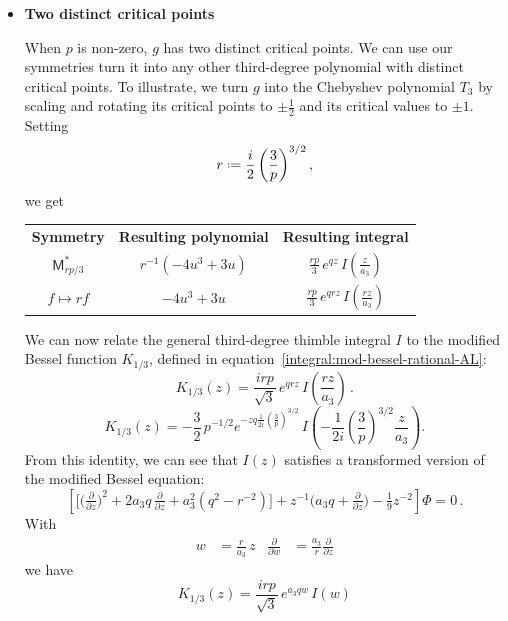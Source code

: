 \documentclass{article}
\newcommand*{\defeq}{\mathrel{\vcenter{\baselineskip0.5ex \lineskiplimit0pt
                     \hbox{\scriptsize.}\hbox{\scriptsize.}}}%
                     =}
\theoremstyle{definition}
\theoremstyle{plain}
\newenvironment{verify}{\color{ForestGreen}}{\color{black}}
\begin{document}
\begin{itemize}
\item[] \textbf{Two distinct critical points}

When $p$ is non-zero, $g$ has two distinct critical points. We can use our symmetries turn it into any other third-degree polynomial with distinct critical points. To illustrate, we turn $g$ into the Chebyshev polynomial $T_3$ by scaling and rotating its critical points to $\pm\tfrac{1}{2}$ and its critical values to $\pm 1$. Setting
\[ r \defeq \frac{i}{2} \left(\frac{3}{p}\right)^{3/2}, \]
we get
\begin{center}
\begin{tabular}{c|c|c}
\textbf{Symmetry} & \textbf{Resulting polynomial} & \textbf{Resulting integral} \\[2mm]
$\displaystyle \mathsf{M}_{rp/3}^*$ & $\displaystyle r^{-1} \left(-4u^3 + 3u\right)$ & $\displaystyle \frac{rp}{3}\,e^{qz}\,I\left(\frac{z}{a_3}\right)$ \\[5mm]
$\displaystyle f \mapsto rf$ & $\displaystyle -4u^3 + 3u$ & $\displaystyle \frac{rp}{3}\,e^{qrz}\,I\left(\frac{rz}{a_3}\right)$ \\[5mm]
\end{tabular}
\end{center}

We can now relate the general third-degree thimble integral $I$ to the modified Bessel function $K_{1/3}$, defined in equation~\eqref{integral:mod-bessel-rational-AL}:
\begin{equation}
K_{1/3}(z) = \frac{irp}{\sqrt{3}}\,e^{qrz}\,I\left(\frac{rz}{a_3}\right)\,.
\end{equation}
\begin{verify}
\begin{equation}
K_{1/3}(z) = -\frac{3}{2}\,p^{-1/2} e^{-zq \frac{1}{2i} \left(\frac{3}{p}\right)^{3/2}}\,I\left(-\frac{1}{2i} \left(\frac{3}{p}\right)^{3/2} \frac{z}{a_3}\right).
\end{equation}
\end{verify}
From this identity, we can see that $I(z)$ satisfies a transformed version of the modified Bessel equation:
\[ \left[ \big[\big(\tfrac{\partial}{\partial z}\big)^2 + 2a_3 q\,\tfrac{\partial}{\partial z} + a_3^2 (q^2 - r^{-2})\big] + z^{-1} \big(a_3 q + \tfrac{\partial}{\partial z}\big) - \tfrac{1}{9} z^{-2} \right] \Phi = 0\,. \]
\begin{verify}
With
\begin{align*}
w & = \frac{r}{a_3}\,z &
\frac{\partial}{\partial w} & = \frac{a_3}{r} \frac{\partial}{\partial z}
\end{align*}
we have
\[ K_{1/3}(z) = \frac{irp}{\sqrt{3}}\,e^{a_3 qw}\,I(w) \]


\end{verify}
\end{itemize}
\end{document}
